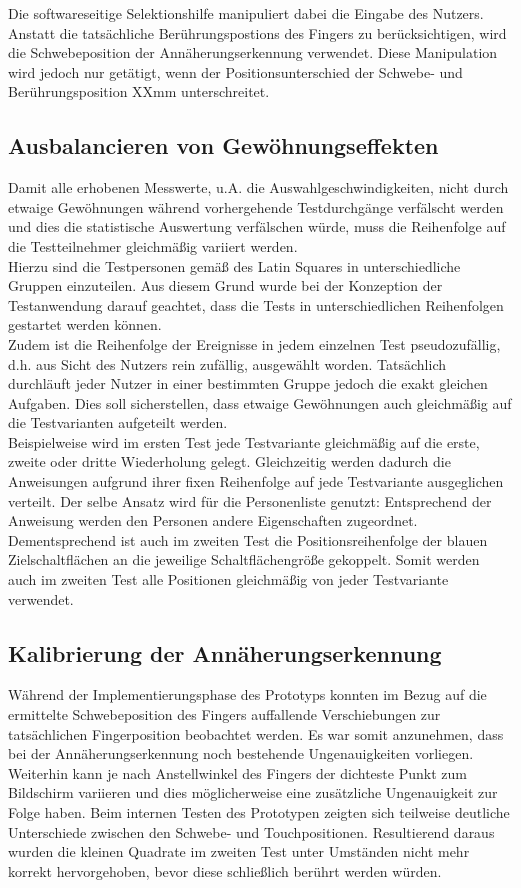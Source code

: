 \documentclass[a4paper,12pt,bibliography=totoc]{scrreprt}%
\begin{document}
Die softwareseitige Selektionshilfe manipuliert dabei die Eingabe des Nutzers. Anstatt die tatsächliche Berührungspostions des Fingers zu berücksichtigen, wird die Schwebeposition der Annäherungserkennung verwendet. Diese Manipulation wird jedoch nur getätigt, wenn der Positionsunterschied der Schwebe- und Berührungsposition XXmm unterschreitet.

\subsection{Ausbalancieren von Gewöhnungseffekten}
Damit alle erhobenen Messwerte, u.A. die Auswahlgeschwindigkeiten, nicht durch etwaige Gewöhnungen während vorhergehende Testdurchgänge verfälscht werden und dies die statistische Auswertung verfälschen würde, muss die Reihenfolge auf die Testteilnehmer gleichmäßig variiert werden.\\
Hierzu sind die Testpersonen gemäß des Latin Squares in unterschiedliche Gruppen einzuteilen. Aus diesem Grund wurde bei der Konzeption der Testanwendung darauf geachtet, dass die Tests in unterschiedlichen Reihenfolgen gestartet werden können.\\
Zudem ist die Reihenfolge der Ereignisse in jedem einzelnen Test pseudozufällig, d.h. aus Sicht des Nutzers rein zufällig, ausgewählt worden. Tatsächlich durchläuft jeder Nutzer in einer bestimmten Gruppe jedoch die exakt gleichen Aufgaben. Dies soll sicherstellen, dass etwaige Gewöhnungen auch gleichmäßig auf die Testvarianten aufgeteilt werden.\\
Beispielweise wird im ersten Test jede Testvariante gleichmäßig auf die erste, zweite oder dritte Wiederholung gelegt. Gleichzeitig werden dadurch die Anweisungen aufgrund ihrer fixen Reihenfolge auf jede Testvariante ausgeglichen verteilt. Der selbe Ansatz wird für die Personenliste genutzt: Entsprechend der Anweisung werden den Personen andere Eigenschaften zugeordnet. Dementsprechend ist auch im zweiten Test die Positionsreihenfolge der blauen Zielschaltflächen an die jeweilige Schaltflächengröße gekoppelt. Somit werden auch im zweiten Test alle Positionen gleichmäßig von jeder Testvariante verwendet.

\subsection{Kalibrierung der Annäherungserkennung}
Während der Implementierungsphase des Prototyps konnten im Bezug auf die ermittelte Schwebeposition des Fingers auffallende  Verschiebungen zur tatsächlichen Fingerposition beobachtet werden. Es war somit anzunehmen, dass bei der Annäherungserkennung noch bestehende Ungenauigkeiten vorliegen. Weiterhin kann je nach Anstellwinkel des Fingers der dichteste Punkt zum Bildschirm variieren und dies möglicherweise eine zusätzliche Ungenauigkeit zur Folge haben. Beim internen Testen des Prototypen zeigten sich teilweise deutliche Unterschiede zwischen den Schwebe- und Touchpositionen. Resultierend daraus wurden die kleinen Quadrate im zweiten Test unter Umständen nicht mehr korrekt hervorgehoben, bevor diese schließlich berührt werden würden.
\end{document}
